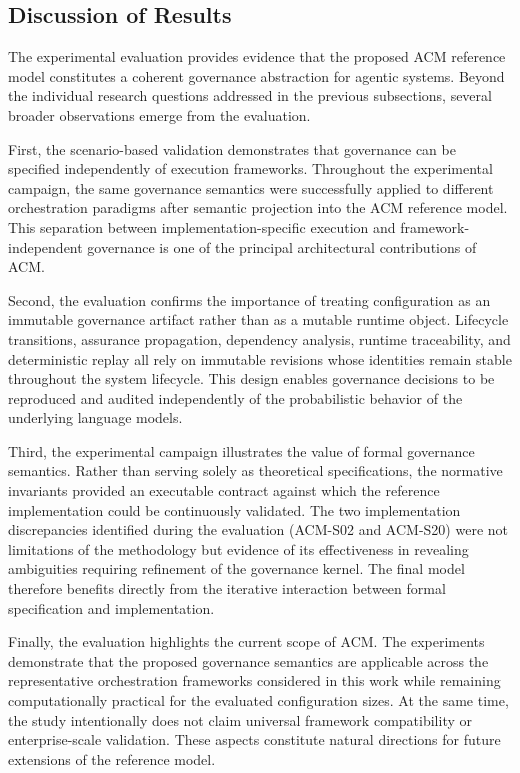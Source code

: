 \documentclass[10pt]{article}
\begin{document}
\subsection{Discussion of Results}
\label{subsec:discussion_results}

The experimental evaluation provides evidence that the proposed ACM reference
model constitutes a coherent governance abstraction for agentic systems. Beyond
the individual research questions addressed in the previous subsections, several
broader observations emerge from the evaluation.

First, the scenario-based validation demonstrates that governance can be
specified independently of execution frameworks. Throughout the experimental
campaign, the same governance semantics were successfully applied to different
orchestration paradigms after semantic projection into the ACM reference model.
This separation between implementation-specific execution and
framework-independent governance is one of the principal architectural
contributions of ACM.

Second, the evaluation confirms the importance of treating configuration as an
immutable governance artifact rather than as a mutable runtime object.
Lifecycle transitions, assurance propagation, dependency analysis, runtime
traceability, and deterministic replay all rely on immutable revisions whose
identities remain stable throughout the system lifecycle. This design enables
governance decisions to be reproduced and audited independently of the
probabilistic behavior of the underlying language models.

Third, the experimental campaign illustrates the value of formal governance
semantics. Rather than serving solely as theoretical specifications, the
normative invariants provided an executable contract against which the reference
implementation could be continuously validated. The two implementation
discrepancies identified during the evaluation (ACM-S02 and ACM-S20) were not
limitations of the methodology but evidence of its effectiveness in revealing
ambiguities requiring refinement of the governance kernel. The final model
therefore benefits directly from the iterative interaction between formal
specification and implementation.

Finally, the evaluation highlights the current scope of ACM. The experiments
demonstrate that the proposed governance semantics are applicable across the
representative orchestration frameworks considered in this work while remaining
computationally practical for the evaluated configuration sizes. At the same
time, the study intentionally does not claim universal framework compatibility
or enterprise-scale validation. These aspects constitute natural directions for
future extensions of the reference model.
\end{document}
